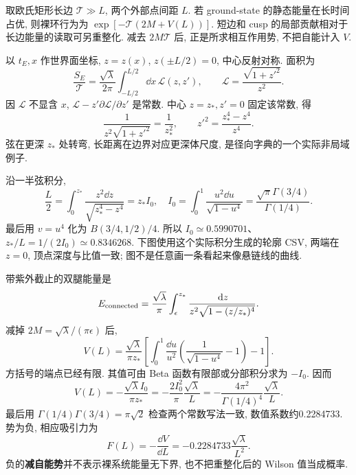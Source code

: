 取欧氏矩形长边 $\mathcal T\gg L$, 两个外部点间距 $L$. 若 ground-state 的静态能量在长时间占优, 则裸环行为为 $\exp[-\mathcal T(2M+V(L))]$. 短边和 cusp 的局部贡献相对于长边能量的读取可另重整化. 减去 $2M\mathcal T$ 后, 正是所求相互作用势, 不把自能计入 $V$.

以 $t_E,x$ 作世界面坐标, $z=z(x)$, $z(\pm L/2)=0$, 中心反射对称. 面积为
\[
\frac{S_E}{\mathcal T}=
\frac{\sqrt\lambda}{2\pi}
\int_{-L/2}^{L/2}\dd x\,
\mathcal L(z,z'),\qquad
\mathcal L=\frac{\sqrt{1+z'^2}}{z^2}.
\]
因 $\mathcal L$ 不显含 $x$, $\mathcal L-z'\partial\mathcal L/\partial z'$ 是常数. 中心 $z=z_*,z'=0$ 固定该常数, 得
\[
\frac1{z^2\sqrt{1+z'^2}}=\frac1{z_*^2},\qquad
z'^2=\frac{z_*^4-z^4}{z^4}.
\]
弦在更深 $z_*$ 处转弯, 长距离在边界对应更深体尺度, 是径向字典的一个实际非局域例子.

沿一半弦积分,
\[
\frac L2=\int_0^{z_*}\frac{z^2\dd z}{\sqrt{z_*^4-z^4}}
=z_* I_0,\quad
I_0=\int_0^1\frac{u^2\dd u}{\sqrt{1-u^4}}
=\frac{\sqrt\pi\Gamma(3/4)}{\Gamma(1/4)}.
\]
最后用 $v=u^4$ 化为 $B(3/4,1/2)/4$. 所以 $I_0\simeq0.5990701$、$z_*/L=1/(2I_0)\simeq0.8346268$. 下图使用这个实际积分生成的轮廓 CSV, 两端在 $z=0$, 顶点深度与比值一致; 图不是任意画一条看起来像悬链线的曲线.

\begin{center}
\end{center}

带紫外截止的双腿能量是
\[
E_{\rm connected}=\frac{\sqrt\lambda}{\pi}
\int_\epsilon^{z_*}\frac{\,\mathrm d z}
{z^2\sqrt{1-(z/z_*)^4}}.
\]
减掉 $2M=\sqrt\lambda/(\pi\epsilon)$ 后,
\[
V(L)=\frac{\sqrt\lambda}{\pi z_*}
\left[\int_0^1\frac{\dd u}{u^2}
\left(\frac1{\sqrt{1-u^4}}-1\right)-1\right].
\]
方括号的端点已经有限. 其值可由 Beta 函数有限部或分部积分求为 $-I_0$. 因而
\[
V(L)=-\frac{\sqrt\lambda I_0}{\pi z_*}
=-\frac{2I_0^2}{\pi}\frac{\sqrt\lambda}L
=-\frac{4\pi^2}{\Gamma(1/4)^4}\frac{\sqrt\lambda}L.
\]
最后用 $\Gamma(1/4)\Gamma(3/4)=\pi\sqrt2$ 检查两个常数写法一致, 数值系数约0.2284733. 势为负, 相应吸引力为
\[
F(L)=-\frac{\dd V}{\dd L}=-0.2284733\frac{\sqrt\lambda}{L^2}.
\]
负的\textbf{减自能势}并不表示裸系统能量无下界, 也不把重整化后的 Wilson 值当成概率.

